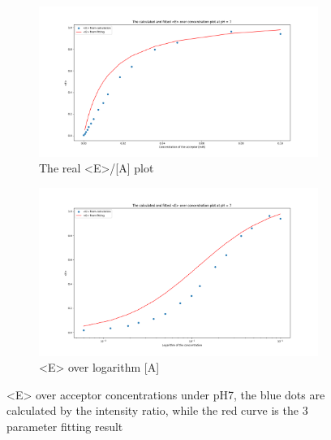 \documentclass[a4paper,english,12pt,bibliography=totoc]{scrreprt}
\begin{document}
\begin{figure}[htbp]
    \centering
    \begin{subfigure}[b]{0.45\textwidth}
        \includegraphics[width=\textwidth]{Figures/E_mean_ph7.png}
        \caption{The real <E>/[A] plot}
    \end{subfigure}
    \quad %
    \begin{subfigure}[b]{0.45\textwidth}
        \includegraphics[width=\textwidth]{Figures/Log_e_mean_ph7.png}
        \caption{<E> over logarithm [A]}
    \end{subfigure}
    \caption{<E> over acceptor concentrations under pH7, the blue dots are calculated by the intensity ratio, while the red curve is the 3 parameter fitting result}
\end{figure}
\end{document}
